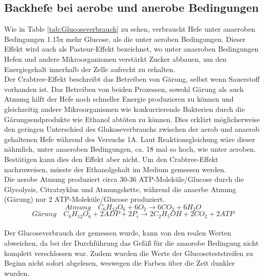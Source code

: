 \documentclass[10pt,a4paper]{article}
\begin{document}
	\subsection{Backhefe bei aerobe und anerobe Bedingungen}
		Wie in Table \ref{tab:Glucoseverbrauch} zu sehen, verbraucht Hefe unter anaeroben Bedingungen 1.15x mehr Glucose, als die unter aeroben Bedingungen. Dieser Effekt wird auch als Pasteur-Effekt bezeichnet, wo unter anaeroben Bedingungen Hefen und andere Mikroorganismen verstärkt Zucker abbauen, um den Energiegehalt innerhalb der Zelle aufrecht zu erhalten. \\
		Der Crabtree-Effekt beschreibt das Betreiben von Gärung, selbst wenn Sauerstoff vorhanden ist. Das Betreiben von beiden Prozessen, sowohl Gärung als auch Atmung hilft der Hefe noch schneller Energie produzieren zu können und gleichzeitig andere Mikroorganismen wie konkurrierende Bakterien durch die Gärungsendprodukte wie Ethanol abtöten zu können. Dies erklärt möglicherweise den geringen Unterschied des Glukoseverbrauchs zwischen der aerob und anaerob gehaltenen Hefe während des Versuchs 1A. Laut Reaktionsgleichung wäre dieser nähmlich, unter anaeroben Bedingungen, ca. 18 mal so hoch, wie unter aeroben. Bestätigen kann dies den Effekt aber nicht. Um den Crabtree-Effekt nachzuweisen, müsste der Ethanolgehalt im Medium gemessen werden.\\
		Die aerobe Atmung produziert circa 30-36 ATP-Moleküle/Glucose durch die Glycolysis, Citratzyklus und Atmungskette, während die anaerbe Atmung (Gärung) nur 2 ATP-Moleküle/Glucose produziert.\\
		
		\begin{equation}\nonumber
			Atmung \quad C_6H_{12}O_6 + 6 O_2 \rightarrow 6 CO_2 + 6 H_2O
		\end{equation}
		\begin{equation}\nonumber
			Gärung \quad C_6H_{12}O_6 + 2 ADP + 2P_i \rightarrow 2 C_2H_5OH + 2 CO_2 + 2 ATP
		\end{equation}
		\\
		Der Glucoseverbrauch der gemessen wurde, kann von den realen Werten abweichen, da bei der Durchführung das Gefäß für die anaorobe Bedingung nicht komplett verschlossen war. Zudem wurden die Werte der Glucoseteststreifen zu Beginn nicht sofort abgelesen, weswegen die Farben über die Zeit dunkler wurden.
		
		
\end{document}
